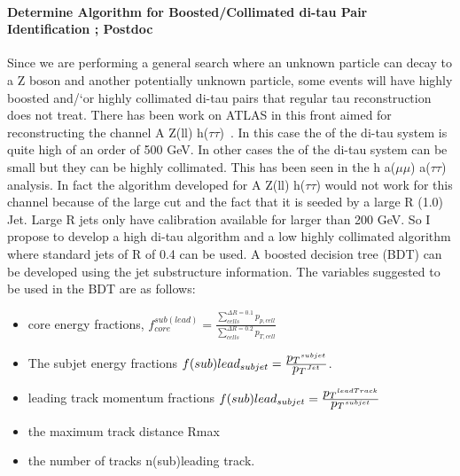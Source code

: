 \paragraph{Determine Algorithm for Boosted/Collimated di-tau Pair Identification ; Postdoc} %
Since we are performing a general search where an unknown particle can decay to a Z boson and another potentially unknown particle, some events will have highly boosted and/`or highly collimated di-tau pairs that regular
tau reconstruction does not treat.  There has been work on ATLAS in this front aimed for reconstructing the channel A \too Z(ll) h($\tau\tau$)~\cite{di-tau-thesis}.  In this case the \pt of the di-tau system is quite high of an order of 500 GeV.
In other cases the \pt of the di-tau system can be small but they can be highly collimated.  This has been seen in the h \too a($\mu \mu$) a($\tau \tau$) analysis.  In fact the algorithm developed for A \too Z(ll) h($\tau\tau$) would not 
work for this channel because of the large \pt cut and the fact that it is seeded by a large R (1.0) Jet.  Large R jets only have calibration available for \pt larger than 200 GeV.  So I propose to develop a high \pt di-tau
algorithm and a low \pt highly collimated algorithm where standard jets of R of 0.4 can be used. A boosted decision tree (BDT) can be developed using the jet substructure information.  
The variables suggested to be used in the BDT are as follows:
\begin{itemize}
\item{core energy fractions, $f_{core}^{sub(lead)}=\frac{\sum_{cells}^{\Delta R=0.1} p_{p,cell}}{\sum_{cells}^{\Delta R=0.2}p_{T,cell}} $}
\item {The subjet energy fractions $f(sub)lead_{subjet}=\frac{\mbox{$p_T$}^{subjet}}{\mbox{$p_T$}^{Jet}}$. }
\item{leading track momentum fractions $f(sub)lead_{subjet}=\frac{\mbox{$p_T$} ^{leadTrack}}{\mbox{$p_T$}^{subjet}}$}
\item{the maximum track distance Rmax}
\item{the number of tracks n(sub)leading track.}
\end{itemize}

